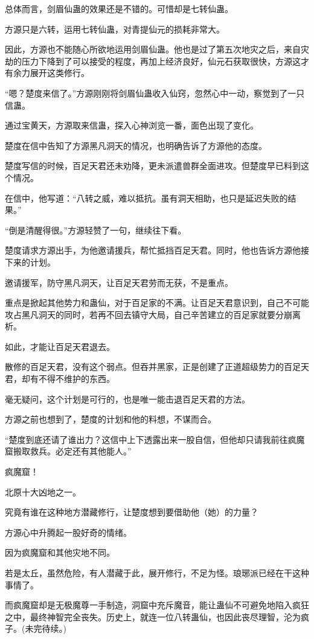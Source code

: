 \begin{this_body}
总体而言，剑眉仙蛊的效果还是不错的。可惜却是七转仙蛊。

方源只是六转，运用七转仙蛊，对青提仙元的损耗非常大。

因此，方源也不能随心所欲地运用剑眉仙蛊。他也是过了第五次地灾之后，来自灾劫的压力下降到了可以接受的程度，再加上经济良好，仙元石获取很快，方源这才有余力展开这类修行。

“嗯？楚度来信了。”方源刚刚将剑眉仙蛊收入仙窍，忽然心中一动，察觉到了一只信蛊。

通过宝黄天，方源取来信蛊，探入心神浏览一番，面色出现了变化。

楚度在信中告知了方源黑凡洞天的情况，也明确告诉了方源他的态度。

楚度写信的时候，百足天君还未劝降，更未派遣兽群全面进攻。但楚度早已料到这个情况。

在信中，他写道：“八转之威，难以抵抗。虽有洞天相助，也只是延迟失败的结果。”

“倒是清醒得很。”方源轻赞了一句，继续往下看。

楚度请求方源出手，为他邀请援兵，帮忙抵挡百足天君。同时，他也告诉方源他接下来的计划。

邀请援军，防守黑凡洞天，让百足天君劳而无获，不是重点。

重点是掀起其他势力和蛊仙，对于百足家的不满。让百足天君意识到，自己不可能攻占黑凡洞天的同时，若再不回去镇守大局，自己辛苦建立的百足家就要分崩离析。

如此，才能让百足天君退去。

散修的百足天君，没有这个弱点。但吞并黑家，正是创建了正道超级势力的百足天君，却有不得不维护的东西。

毫无疑问，这个计划是可行的，也是唯一能击退百足天君的方法。

方源之前也想到了，楚度的计划和他的料想，不谋而合。

“楚度到底还请了谁出力？这信中上下透露出来一股自信，但他却只请我前往疯魔窟搬取救兵。必定还有其他能人。”

疯魔窟！

北原十大凶地之一。

究竟有谁在这种地方潜藏修行，让楚度想到要借助他（她）的力量？

方源心中升腾起一股好奇的情绪。

因为疯魔窟和其他灾地不同。

若是太丘，虽然危险，有人潜藏于此，展开修行，不足为怪。琅琊派已经在干这种事情了。

而疯魔窟却是无极魔尊一手制造，洞窟中充斥魔音，能让蛊仙不可避免地陷入疯狂之中，最终神智完全丧失。历史上，就连一位八转蛊仙，也因此丧尽理智，沦为疯子。(未完待续。)

\end{this_body}


